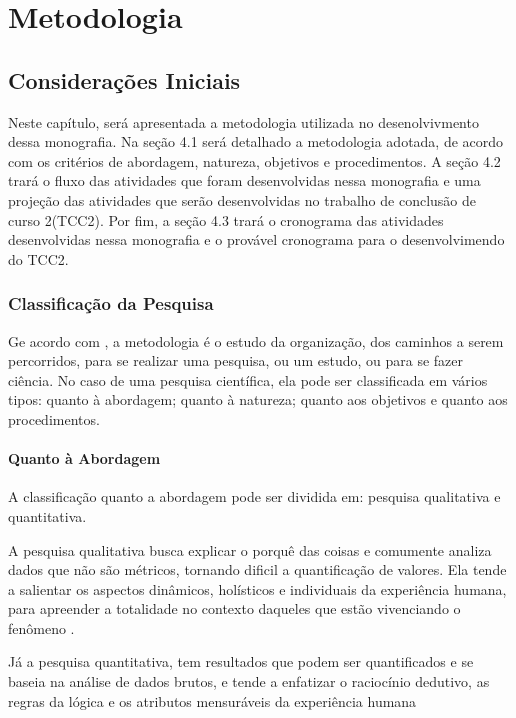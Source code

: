 \chapter[Metodologia]{Metodologia}

\section{Considerações Iniciais}

Neste capítulo, será apresentada a metodologia utilizada no desenolvivmento dessa 
monografia. Na seção 4.1 será detalhado a metodologia adotada, de acordo com os 
critérios de abordagem, natureza, objetivos e procedimentos. A seção 4.2 trará o fluxo 
das atividades que foram desenvolvidas nessa monografia e uma projeção das atividades 
que serão desenvolvidas no trabalho de conclusão de curso 2(TCC2). Por fim, a seção 4.3 trará 
o cronograma das atividades desenvolvidas nessa monografia e o provável cronograma para 
o desenvolvimendo do TCC2.


\subsection{Classificação da Pesquisa}

Ge acordo com , a metodologia é o estudo da organização, dos 
caminhos a serem percorridos, para se realizar uma pesquisa, ou um estudo, ou para se 
fazer ciência. No caso de uma pesquisa científica, ela pode ser classificada em 
vários tipos: quanto à abordagem; quanto à natureza; quanto aos objetivos e quanto aos procedimentos.

\subsubsection{Quanto à Abordagem}

A classificação quanto a abordagem pode ser dividida em: pesquisa qualitativa e quantitativa. 

A pesquisa qualitativa busca explicar o porquê das coisas e 
comumente analiza dados que não são métricos, tornando dificil 
a quantificação de valores. Ela tende a salientar os
aspectos dinâmicos, holísticos e individuais da experiência humana, para apreender
a totalidade no contexto daqueles que estão vivenciando o fenômeno \cite{gerhardt2009}.

Já a pesquisa quantitativa, tem resultados que podem ser quantificados e se baseia na 
análise de dados brutos, e tende a enfatizar o raciocínio dedutivo, as regras da lógica 
e os atributos mensuráveis da experiência humana

